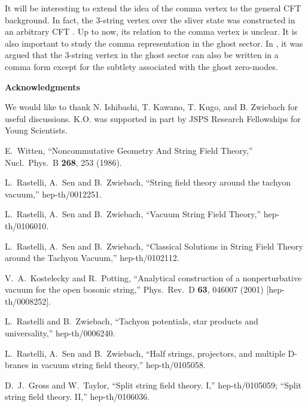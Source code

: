 \documentclass[a4paper,12pt]{article}
\begin{document}
It will be interesting to extend the idea of the comma vertex to
the general CFT background. In fact, the 3-string vertex over the sliver
state was constructed in an arbitrary CFT \cite{David}. Up to now,
its relation to the comma vertex is unclear.
It is also important to study the comma representation
in the ghost sector. In \cite{KosteleckyPotting}, it was argued that
the 3-string vertex in the ghost sector can also be written in a comma form
except for the subtlety associated with the ghost zero-modes.


\vskip 10mm
\centerline{\bf Acknowledgments}
We would like to thank N. Ishibashi,
T. Kawano, T. Kugo, and B. Zwiebach for useful discussions.
K.\myHighlight{$\,$}\coordHE{}O. was supported in part by JSPS Research Fellowships for Young
Scientists.


\begin{thebibliography}{999}
\parskip=-3pt
E.~Witten,
``Noncommutative Geometry And String Field Theory,''
Nucl.\ Phys.\ B {\bf 268}, 253 (1986).

L.~Rastelli, A.~Sen and B.~Zwiebach,
``String field theory around the tachyon vacuum,''
hep-th/0012251.

L.~Rastelli, A.~Sen and B.~Zwiebach,
``Vacuum String Field Theory,''
hep-th/0106010.

L.~Rastelli, A.~Sen and B.~Zwiebach,
``Classical Solutions in String Field Theory around the Tachyon Vacuum,''
hep-th/0102112.

V.~A.~Kostelecky and R.~Potting,
``Analytical construction of a nonperturbative vacuum 
for the open  bosonic string,''
Phys.\ Rev.\ D {\bf 63}, 046007 (2001)
[hep-th/0008252].

L.~Rastelli and B.~Zwiebach,
``Tachyon potentials, star products and universality,''
hep-th/0006240.

L.~Rastelli, A.~Sen and B.~Zwiebach,
``Half strings, projectors, and multiple D-branes in 
vacuum string field  theory,''
hep-th/0105058.

D.~J.~Gross and W.~Taylor,
``Split string field theory. I,''
hep-th/0105059;
``Split string field theory. II,''
hep-th/0106036.


\end{thebibliography}
\end{document}
